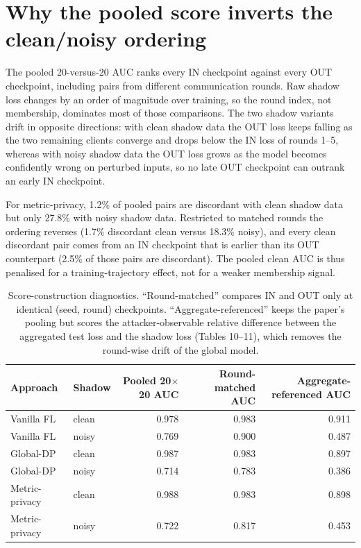 \documentclass[10pt]{article}
\begin{document}
\clearpage
\section*{Why the pooled score inverts the clean/noisy ordering}
The pooled 20-versus-20 AUC ranks every IN checkpoint against every OUT checkpoint, including pairs from
different communication rounds. Raw shadow loss changes by an order of magnitude over training, so the round
index, not membership, dominates most of those comparisons. The two shadow variants drift in opposite
directions: with clean shadow data the OUT loss keeps falling as the two remaining clients converge and drops
below the IN loss of rounds 1--5, whereas with noisy shadow data the OUT loss grows as the model becomes
confidently wrong on perturbed inputs, so no late OUT checkpoint can outrank an early IN checkpoint.

For metric-privacy, 1.2\% of pooled pairs are discordant with clean shadow data but only
27.8\% with noisy shadow data. Restricted to matched rounds the ordering reverses
(1.7\% discordant clean versus 18.3\% noisy), and
every clean discordant pair comes from an IN checkpoint that is earlier than its OUT counterpart
(2.5\% of those pairs are discordant). The pooled clean AUC is thus penalised for a
training-trajectory effect, not for a weaker membership signal.

\begin{table}[h]
\centering
\caption{Score-construction diagnostics. ``Round-matched'' compares IN and OUT only at identical
(seed, round) checkpoints. ``Aggregate-referenced'' keeps the paper's pooling but scores the
attacker-observable relative difference between the aggregated test loss and the shadow loss
(Tables 10--11), which removes the round-wise drift of the global model.}
\begin{tabular}{llrrr}
\toprule
Approach & Shadow & Pooled 20$\times$20 AUC & Round-matched AUC & Aggregate-referenced AUC \\
\midrule
Vanilla FL & clean & 0.978 & 0.983 & 0.911 \\
Vanilla FL & noisy & 0.769 & 0.900 & 0.487 \\
\midrule
Global-DP & clean & 0.987 & 0.983 & 0.897 \\
Global-DP & noisy & 0.714 & 0.783 & 0.386 \\
\midrule
Metric-privacy & clean & 0.988 & 0.983 & 0.898 \\
Metric-privacy & noisy & 0.722 & 0.817 & 0.453 \\
\bottomrule
\end{tabular}
\end{table}
\end{document}
